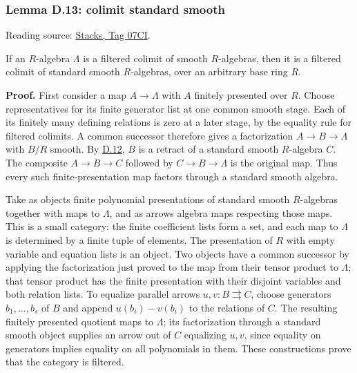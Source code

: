 \documentclass[11pt,a4paper,openany]{report}
\begin{document}
\label{AG-RG-S05-smoothing-lemma-colimit-standard-smooth}

\subsubsection{Lemma D.13: colimit standard smooth}\label{AG-RG-S05-lemma-d.13-colimit-standard-smooth}

Reading source: \href{https://stacks.math.columbia.edu/tag/07CI}{Stacks, Tag 07CI}.

If an \(R\)-algebra \(\Lambda\) is a filtered colimit of smooth \(R\)-algebras, then it is a filtered colimit of standard smooth \(R\)-algebras, over an arbitrary base ring \(R\).

\textbf{Proof.} First consider a map \(A\to\Lambda\) with \(A\) finitely presented over \(R\). Choose representatives for its finite generator list at one common smooth stage. Each of its finitely many defining relations is zero at a later stage, by the equality rule for filtered colimits. A common successor therefore gives a factorization \(A\to B\to\Lambda\) with \(B/R\) smooth. By \hyperref[AG-RG-S05-smoothing-lemma-smooth-standard-smooth]{D.12}, \(B\) is a retract of a standard smooth \(R\)-algebra \(C\). The composite \(A\to B\to C\) followed by \(C\to B\to\Lambda\) is the original map. Thus every such finite-presentation map factors through a standard smooth algebra.

Take as objects finite polynomial presentations of standard smooth \(R\)-algebras together with maps to \(\Lambda\), and as arrows algebra maps respecting those maps. This is a small category: the finite coefficient lists form a set, and each map to \(\Lambda\) is determined by a finite tuple of elements. The presentation of \(R\) with empty variable and equation lists is an object. Two objects have a common successor by applying the factorization just proved to the map from their tensor product to \(\Lambda\); that tensor product has the finite presentation with their disjoint variables and both relation lists. To equalize parallel arrows \(u,v\colon B\rightrightarrows C\), choose generators \(b_1,\ldots,b_s\) of \(B\) and append \(u(b_i)-v(b_i)\) to the relations of \(C\). The resulting finitely presented quotient maps to \(\Lambda\); its factorization through a standard smooth object supplies an arrow out of \(C\) equalizing \(u,v\), since equality on generators implies equality on all polynomials in them. These constructions prove that the category is filtered.
\end{document}
